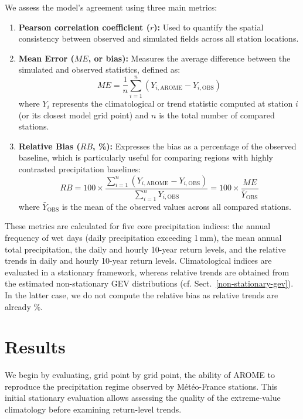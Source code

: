 \documentclass[hess, manuscript]{copernicus}
\begin{document}
We assess the model's agreement using three main metrics:
\begin{enumerate}
    \item \textbf{Pearson correlation coefficient ($r$):} Used to quantify the spatial consistency between observed and simulated fields across all station locations.
    \item \textbf{Mean Error ($ME$, or bias):} Measures the average difference between the simulated and observed statistics, defined as:
    \begin{equation}
        ME = \frac{1}{n}\sum_{i=1}^{n} (Y_{i,\text{AROME}} - Y_{i,\text{OBS}})
    \end{equation}
    where $Y_i$ represents the climatological or trend statistic computed at station $i$ (or its closest model grid point) and $n$ is the total number of compared stations.
    \item \textbf{Relative Bias ($RB$, \%):} Expresses the bias as a percentage of the observed baseline, which is particularly useful for comparing regions with highly contrasted precipitation baselines:
    \begin{equation}
        RB = 100 \times \frac{\sum_{i=1}^{n} (Y_{i,\text{AROME}} - Y_{i,\text{OBS}})}{\sum_{i=1}^{n} Y_{i,\text{OBS}}} = 100 \times \frac{ME}{\bar{Y}_{\text{OBS}}}
    \end{equation}
    where $\bar{Y}_{\text{OBS}}$ is the mean of the observed values across all compared stations.
\end{enumerate}

These metrics are calculated for five core precipitation indices: the annual frequency of wet days (daily precipitation exceeding 1\,mm), the mean annual total precipitation, the daily and hourly 10-year return levels, and the relative trends in daily and hourly 10-year return levels. Climatological indices are evaluated in a stationary framework, whereas relative trends are obtained from the estimated non-stationary GEV distributions (cf. Sect.~\ref{non-stationary-gev}). In the latter case, we do not compute the relative bias as relative trends are already \%.

\section{Results}\label{results}

We begin by evaluating, grid point by grid point, the ability of AROME
to reproduce the precipitation regime observed by Météo-France stations.
This initial stationary evaluation allows assessing the quality of the extreme-value climatology before examining return-level trends.
\end{document}
